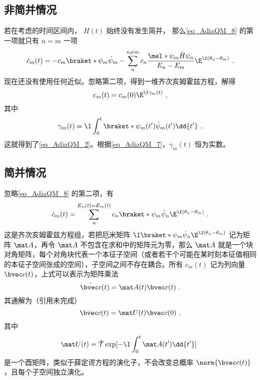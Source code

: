 \subsection{非简并情况}
若在考虑的时间区间内， $H(t)$ 始终没有发生简并， 那么\autoref{eq_AdiaQM_8} 的第一项就只有 $n=m$ 一项
\begin{equation}
\dot c_m(t) = -c_m \braket*{\psi_m}{\dot\psi_m} - \sum_{n}^{n\ne m} c_n \frac{\mel*{\psi_m}{\dot H}{\psi_n}}{E_n-E_m} \E^{\I(\theta_n-\theta_m)}~.
\end{equation}
现在还没有使用任何近似。忽略第二项，得到一维齐次亥姆霍兹方程，解得
\begin{equation}
c_m(t) = c_m(0)\E^{\I\gamma_m(t)}~,
\end{equation}
其中
\begin{equation}
\gamma_m(t) = \I \int_0^t \braket*{\psi_m(t')}{\dot\psi_m(t')}\dd{t'}~.
\end{equation}
这就得到了\autoref{eq_AdiaQM_2}。根据\autoref{eq_AdiaQM_7}，$\gamma_m(t)$ 恒为实数。

\subsection{简并情况}
忽略\autoref{eq_AdiaQM_8} 的第二项，有
\begin{equation}
\dot c_m(t) = \sum_{n}^{E_n(t)=E_m(t)} c_n \braket*{\psi_m}{\dot\psi_n}\E^{\I(\theta_n-\theta_m)}~.
\end{equation}
这是齐次亥姆霍兹方程组，若把厄米矩阵 $\I\braket*{\psi_m}{\dot\psi_n}\E^{\I(\theta_n-\theta_m)}$ 记为矩阵 $\mat A$，再令 $\mat A$ 不包含在求和中的矩阵元为零，那么 $\mat A$ 就是一个块对角矩阵，每个对角块代表一个本征子空间（或者若干个可能在某时刻本征值相同的本征子空间张成的空间），子空间之间不存在耦合。所有 $c_m(t)$ 记为列向量 $\bvec c(t)$，上式可以表示为矩阵乘法
\begin{equation}
\dot{\bvec c}(t) = \mat A(t) \bvec c(t)~.
\end{equation}
其通解为（引用未完成）
\begin{equation}
\bvec c(t) = \mat U(t)\bvec c(0)~.
\end{equation}
其中
\begin{equation}
\mat U(t) = \hat{\mathcal{T}}\exp[-\I \int_0^t \mat A(t') \dd{t'}]~
\end{equation}
是一个酉矩阵，类似于薛定谔方程的演化子，不会改变总概率 $\norm{\bvec c(t)}$，且每个子空间独立演化。

